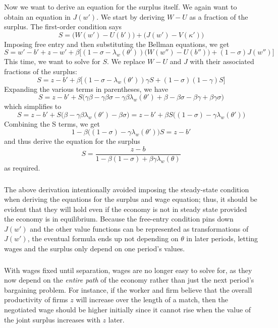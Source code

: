 \documentclass[12pt, letterpaper, parskip = full]{article}
\begin{document}
	Now we want to derive an equation for the surplus itself. We again want to obtain an equation in \(J(w')\). We start by deriving \(W - U\) as a fraction of the surplus. The first-order condition says 
	\[ S = \Big(W(w') - U(b')\Big) + \Big(J(w') - V(\kappa')\Big)  \]
	Imposing free entry and then substituting the Bellman equations, we get
	\[ S = w' - b' + z - w' + \beta \bigg[ (1 - \sigma - \lambda_w(\theta')) \Big(W(w'') - U(b'')\Big) + (1 - \sigma) J(w'') \bigg]     \]
	This time, we want to solve for \(S\). We replace \(W - U\) and \(J\) with their associated fractions of the surplus:
	\[ S = z - b' + \beta \bigg[ (1 - \sigma - \lambda_w(\theta')) \gamma S  + (1 - \sigma) (1 - \gamma) S \bigg]     \]
	Expanding the various terms in parentheses, we have
	\[ S = z - b' + S \Big( \gamma \beta - \gamma \beta \sigma - \gamma \beta \lambda_w(\theta') + \beta - \beta \sigma - \beta \gamma + \beta \gamma \sigma   \Big)    \]
	which simplifies to 
	\[ S = z - b' + S \Big( \beta - \gamma \beta \lambda_w(\theta') - \beta \sigma   \Big) = z - b' + \beta S \Big( (1 - \sigma) - \gamma \lambda_w(\theta')   \Big)    \]
	Combining the S terms, we get
	\[ 1 -  \beta \Big( (1 - \sigma) - \gamma \lambda_w(\theta')   \Big) S = z - b' \]
	and thus derive the equation for the surplus
	\[ S = \frac{z - b}{1 -  \beta (1 - \sigma) + \beta \gamma \lambda_w(\theta)} \]
	as required. 
	\subsubsection{}

	The above derivation intentionally avoided imposing the steady-state condition when deriving the equations for the surplus and wage equation; thus, it should be evident that they will hold even if the economy is not in steady state provided the economy is in equilibrium. Because the free-entry condition pins down \(J(w')\) and the other value functions can be represented as transformations of \(J(w')\), the eventual formula ends up not depending on \(\theta\) in later periods, letting wages and the surplus only depend on one period's values.

	\subsubsection{}

	With wages fixed until separation, wages are no longer easy to solve for, as they now depend on the \emph{entire path} of the economy rather than just the next period's bargaining problem. For instance, if the worker and firm believe that the overall productivity of firms \(z\) will increase over the length of a match, then the negotiated wage should be higher initially since it cannot rise when the value of the joint surplus increases with \(z\) later. 
\end{document}
